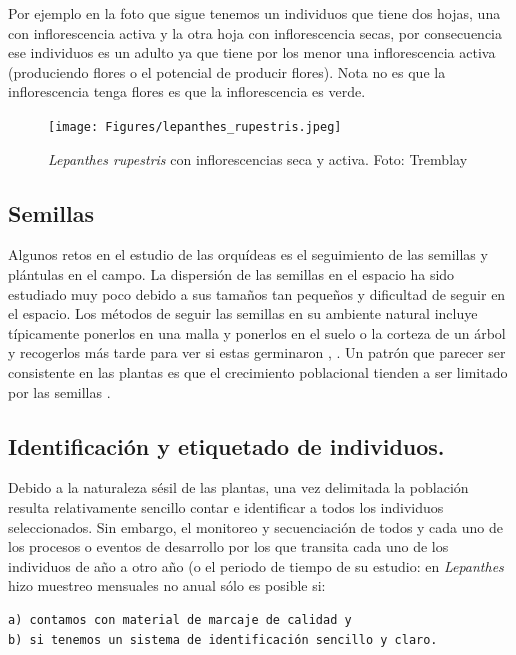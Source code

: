 \documentclass[
]{book}
\theoremstyle{definition}
\theoremstyle{definition}
\theoremstyle{definition}
\theoremstyle{definition}
\theoremstyle{remark}
\begin{document}
Por ejemplo en la foto que sigue tenemos un individuos que tiene dos hojas, una con inflorescencia activa y la otra hoja con inflorescencia secas, por consecuencia ese individuos es un adulto ya que tiene por los menor una inflorescencia activa (produciendo flores o el potencial de producir flores).
Nota no es que la inflorescencia tenga flores es que la inflorescencia es verde.

\begin{figure}
\centering
\texttt{[image: Figures/lepanthes\_rupestris.jpeg]}
\caption{\emph{Lepanthes rupestris} con inflorescencias seca y activa. Foto: Tremblay}
\end{figure}

\subsection{Semillas}\label{semillas}

Algunos retos en el estudio de las orquídeas es el seguimiento de las semillas y plántulas en el campo.
La dispersión de las semillas en el espacio ha sido estudiado muy poco \citep{ackerman1996seedling} debido a sus tamaños tan pequeños y dificultad de seguir en el espacio.
Los métodos de seguir las semillas en su ambiente natural incluye típicamente ponerlos en una malla y ponerlos en el suelo o la corteza de un árbol y recogerlos más tarde para ver si estas germinaron \citep{rasmussen1993seed}, \citep{whigham2006seed}.
Un patrón que parecer ser consistente en las plantas es que el crecimiento poblacional tienden a ser limitado por las semillas \citep{turnbull2000plant}.

\subsection{Identificación y etiquetado de individuos.}\label{identificaciuxf3n-y-etiquetado-de-individuos.}

Debido a la naturaleza sésil de las plantas, una vez delimitada la población resulta relativamente sencillo contar e identificar a todos los individuos seleccionados.
Sin embargo, el monitoreo y secuenciación de todos y cada uno de los procesos o eventos de desarrollo por los que transita cada uno de los individuos de año a otro año (o el periodo de tiempo de su estudio: en \emph{Lepanthes} hizo muestreo mensuales no anual \citep{tremblay2003population} sólo es posible si:

\begin{verbatim}
a) contamos con material de marcaje de calidad y 
b) si tenemos un sistema de identificación sencillo y claro. 
\end{verbatim}
\end{document}
